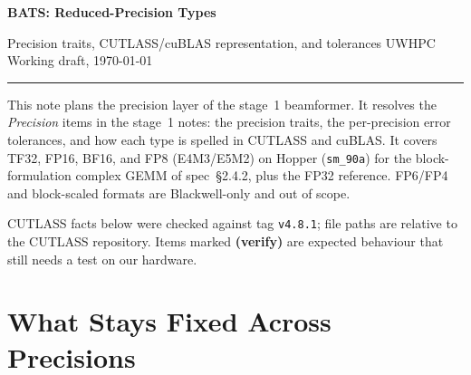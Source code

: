 \documentclass[10pt,letterpaper]{article}
\begin{document}
{\LARGE\bfseries BATS: Reduced-Precision Types\par}
\vspace{2pt}
{\large Precision traits, CUTLASS/cuBLAS representation, and tolerances \hfill UWHPC \textperiodcentered{} Working draft, \today\par}
\vspace{-4pt}
\noindent\rule{\linewidth}{0.6pt}

This note plans the precision layer of the stage~1 beamformer. It resolves the \emph{Precision} items in the stage~1 notes: the precision traits, the per-precision error tolerances, and how each type is spelled in CUTLASS and cuBLAS. It covers TF32, FP16, BF16, and FP8 (E4M3/E5M2) on Hopper (\texttt{sm\_90a}) for the block-formulation complex GEMM of spec~\S2.4.2, plus the FP32 reference. FP6/FP4 and block-scaled formats are Blackwell-only and out of scope.

CUTLASS facts below were checked against tag \texttt{v4.8.1}; file paths are relative to the CUTLASS repository. Items marked \textbf{(verify)} are expected behaviour that still needs a test on our hardware.

\section{What Stays Fixed Across Precisions}
\end{document}
